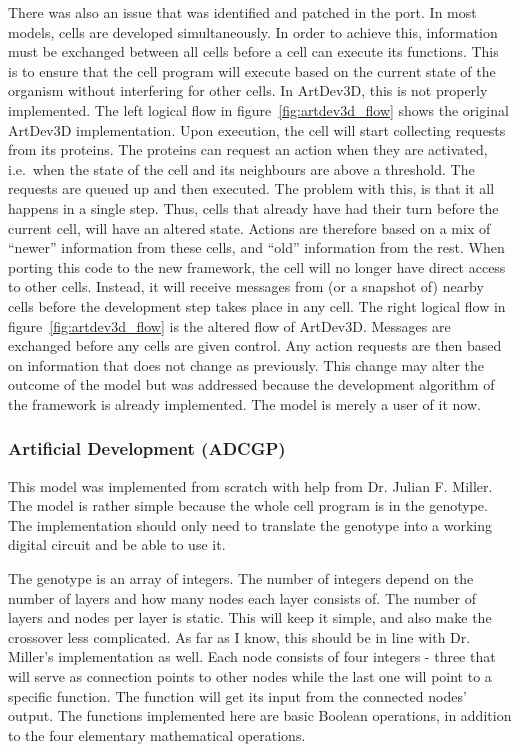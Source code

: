 There was also an issue that was identified and patched in the port. In most models, cells are developed simultaneously. In order to achieve this, information must be exchanged between all cells before a cell can execute its functions. This is to ensure that the cell program will execute based on the current state of the organism without interfering for other cells. In ArtDev3D, this is not properly implemented. The left logical flow in figure~\ref{fig:artdev3d_flow} shows the original ArtDev3D implementation. Upon execution, the cell will start collecting requests from its proteins. The proteins can request an action when they are activated, i.e.\ when the state of the cell and its neighbours are above a threshold. The requests are queued up and then executed. The problem with this, is that it all happens in a single step. Thus, cells that already have had their turn before the current cell, will have an altered state. Actions are therefore based on a mix of ``newer'' information from these cells, and ``old'' information from the rest. When porting this code to the new framework, the cell will no longer have direct access to other cells. Instead, it will receive messages from (or a snapshot of) nearby cells before the development step takes place in any cell. The right logical flow in figure~\ref{fig:artdev3d_flow} is the altered flow of ArtDev3D. Messages are exchanged before any cells are given control. Any action requests are then based on information that does not change as previously. This change may alter the outcome of the model but was addressed because the development algorithm of the framework is already implemented. The model is merely a user of it now.


\subsubsection{Artificial Development (ADCGP)}
\label{sec:cartesian}
This model was implemented from scratch with help from Dr. Julian F. Miller. The model is rather simple because the whole cell program is in the genotype. The implementation should only need to translate the genotype into a working digital circuit and be able to use it.

The genotype is an array of integers. The number of integers depend on the number of layers and how many nodes each layer consists of. The number of layers and nodes per layer is static. This will keep it simple, and also make the crossover less complicated. As far as I know, this should be in line with Dr. Miller's implementation as well. Each node consists of four integers - three that will serve as connection points to other nodes while the last one will point to a specific function. The function will get its input from the connected nodes' output. The functions implemented here are basic Boolean operations, in addition to the four elementary mathematical operations.

